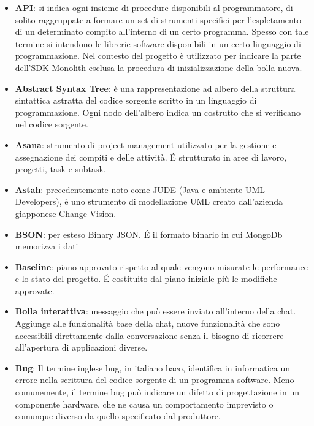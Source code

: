 \begin{itemize}
\item[] \textbf{API}: si indica ogni insieme di procedure disponibili al programmatore, di solito raggruppate a formare un set di strumenti specifici per l'espletamento di un determinato compito all'interno di un certo programma. Spesso con tale termine si intendono le librerie software disponibili in un certo linguaggio di programmazione. Nel contesto del progetto è utilizzato per indicare la parte dell'SDK Monolith esclusa la procedura di inizializzazione della bolla nuova.
\item[] \textbf{Abstract Syntax Tree}: è una rappresentazione ad albero della struttura sintattica astratta del codice sorgente scritto in un linguaggio di programmazione. Ogni nodo dell'albero indica un costrutto che si verificano nel codice sorgente.
\item[] \textbf{Asana}: strumento di project management utilizzato per la gestione e assegnazione dei compiti e delle attività. \'E strutturato in aree di lavoro, progetti, task e subtask.
\item[] \textbf{Astah}: precedentemente noto come JUDE (Java e ambiente UML Developers), è uno strumento di modellazione UML creato dall'azienda giapponese Change Vision.
\end{itemize}
\newpage

\begin{itemize}
\item[] \textbf{BSON}: per esteso Binary JSON. \'E il formato binario in cui MongoDb memorizza i dati
\item[] \textbf{Baseline}: piano approvato rispetto al quale vengono misurate le performance e lo stato del progetto. \'E costituito dal piano iniziale più le modifiche approvate.
\item[] \textbf{Bolla interattiva}: messaggio che può essere inviato all'interno della chat. Aggiunge alle funzionalità base della chat, nuove funzionalità che sono accessibili direttamente dalla conversazione senza il bisogno di ricorrere all'apertura di applicazioni diverse.
\item[] \textbf{Bug}: Il termine inglese bug, in italiano baco, identifica in informatica un errore nella scrittura del codice sorgente di un programma software. Meno comunemente, il termine bug può indicare un difetto di progettazione in un componente hardware, che ne causa un comportamento imprevisto o comunque diverso da quello specificato dal produttore.
\end{itemize}
\newpage


